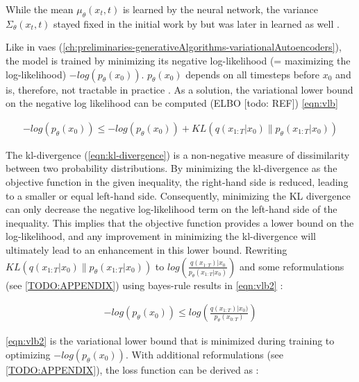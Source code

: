 While the mean $\mu_{\theta}(x_t, t)$ is learned by the neural network, the variance $\Sigma_{\theta}(x_t, t)$ stayed fixed in the initial work by \cite{ho2020DenoisingDiffusionProbabilistic} 
but was later in \cite{nichol2021ImprovedDenoisingDiffusion} learned as well \cite{zbinden2022ImplementingExperimentingDiffusion}.

Like in \glspl{vae} (\autoref{ch:preliminaries-generativeAlgorithms-variationalAutoencoders}), the model is trained by minimizing its negative log-likelihood (= maximizing the log-likelihood) $-log(p_\theta(x_0))$.
$p_\theta(x_0)$ depends on all timesteps before $x_0$ and is, therefore, not tractable in practice \cite{zbinden2022ImplementingExperimentingDiffusion}.
As a solution, the variational lower bound on the negative log likelihood can be computed (ELBO [todo: REF]) \autoref{eqn:vlb}

\begin{equation}
  \label{eqn:vlb}
  \begin{align*}
    -log(p_\theta(x_0)) \leq -log(p_\theta(x_0)) + KL(q(x_{1:T}|x_0) \parallel p_\theta(x_{1:T}|x_0))
  \end{align*}
\end{equation}

The \gls{kl}-divergence (\autoref{eqn:kl-divergence}) is a non-negative measure of dissimilarity between two probability distributions. 
By minimizing the \gls{kl}-divergence as the objective function in the given inequality, the right-hand side is reduced, leading to a smaller or equal left-hand side. 
Consequently, minimizing the KL divergence can only decrease the negative log-likelihood term on the left-hand side of the inequality. 
This implies that the objective function provides a lower bound on the log-likelihood, and any improvement in minimizing the \gls{kl}-divergence will ultimately lead to an enhancement in this lower bound.
Rewriting $KL(q(x_{1:T}|x_0) \parallel p_\theta(x_{1:T}|x_0))$ to $log(\frac{q(x_{1:T})|x_0}{p_\theta(x_{1:T}|x_0)})$ and some reformulations (see \autoref{TODO:APPENDIX}) using bayes-rule results in \autoref{eqn:vlb2} \cite{ho2020DenoisingDiffusionProbabilistic}:

\begin{equation}
  \label{eqn:vlb2}
  \begin{align*}
    -log(p_\theta(x_0)) \leq log(\frac{q(x_{1:T})|x_0)}{p_\theta(x_{0:T})})
  \end{align*}
\end{equation}

\autoref{eqn:vlb2} is the variational lower bound that is minimized during training to optimizing $-log(p_\theta(x_0))$.
With additional reformulations (see \autoref{TODO:APPENDIX}), the loss function can be derived as \cite{ho2020DenoisingDiffusionProbabilistic}:

